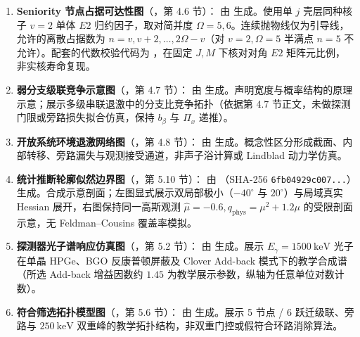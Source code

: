 \begin{enumerate}[label=(\arabic*),leftmargin=2em]
    \vspace{1ex}
    \item \textbf{Seniority 节点占据可达性图}（，第 4.6 节）：
    由  生成。使用单 $j$ 壳层同种核子 $v=2$ 单体 $E2$ 归约因子，取对简并度 $\Omega=5, 6$。连续抛物线仅为引导线，允许的离散占据数为 $n = v, v+2, \dots, 2\Omega - v$（对 $v=2, \Omega=5$ 半满点 $n=5$ 不允许）。配套的代数校验代码为 ，在固定 $J, M$ 下核对对角 $E2$ 矩阵元比例，非实核寿命复现。
    \vspace{1ex}
    \item \textbf{弱分支级联竞争示意图}（，第 4.7 节）：
    由  生成。声明宽度与概率结构的原理示意；展示多级串联退激中的分支比竞争拓扑（依据第 4.7 节正文，未做探测门限或旁路损失拟合仿真，保持 $b_\beta$ 与 $\Pi_x$ 递推）。
    \vspace{1ex}
    \item \textbf{开放系统环境退激网络图}（，第 4.8 节）：
    由  生成。概念性区分形成截面、内部转移、旁路漏失与观测接受通道，非声子浴计算或 Lindblad 动力学仿真。
    \vspace{1ex}
    \item \textbf{统计推断轮廓似然边界图}（，第 5.10 节）：
    由 （SHA-256 \texttt{6fb04929c007...}）生成。合成示意剖面；左图显式展示双局部极小（$-40^\circ$ 与 $20^\circ$）与局域真实 Hessian 展开，右图保持同一高斯观测 $\hat{\mu}=-0.6, q_{\mathrm{phys}} = \mu^2 + 1.2\mu$ 的受限剖面示意，无 Feldman--Cousins 覆盖率模拟。
    \vspace{1ex}
    \item \textbf{探测器光子谱响应仿真图}（，第 5.2 节）：
    由  生成。展示 $E_\gamma = 1500\ \mathrm{keV}$ 光子在单晶 HPGe、BGO 反康普顿屏蔽及 Clover Add-back 模式下的教学合成谱（所选 Add-back 增益因数约 $1.45$ 为教学展示参数，纵轴为任意单位对数计数）。
    \vspace{1ex}
    \item \textbf{符合筛选拓扑模型图}（，第 5.6 节）：
    由  生成。展示 5 节点 / 6 跃迁级联、旁路与 $250\ \mathrm{keV}$ 双重峰的教学拓扑结构，非双重门控或假符合环路消除算法。

\end{enumerate}
